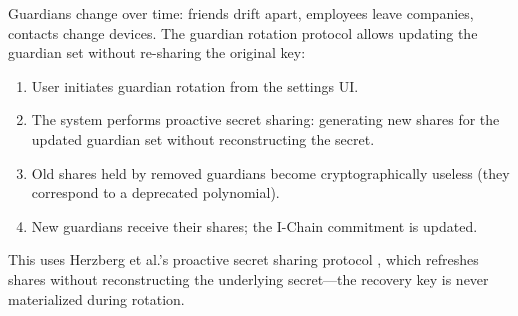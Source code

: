 Guardians change over time: friends drift apart, employees leave companies,
contacts change devices. The guardian rotation protocol allows updating the
guardian set without re-sharing the original key:

\begin{enumerate}
    \item User initiates guardian rotation from the settings UI.
    \item The system performs proactive secret sharing: generating new shares
    for the updated guardian set without reconstructing the secret.
    \item Old shares held by removed guardians become cryptographically
    useless (they correspond to a deprecated polynomial).
    \item New guardians receive their shares; the I-Chain commitment is updated.
\end{enumerate}

This uses Herzberg et al.'s proactive secret sharing protocol
\cite{herzberg1995proactive}, which refreshes shares without
reconstructing the underlying secret---the recovery key is never
materialized during rotation.

